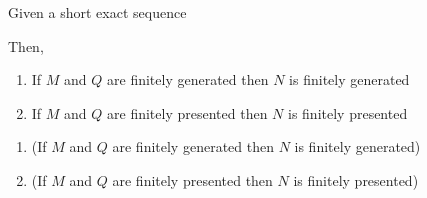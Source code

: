 \begin{proposition}
	Given a short exact sequence
	\begin{center}
	\end{center}
	
	Then,
	\begin{enumerate}
		\item If $M$ and $Q$ are finitely generated then $N$ is finitely generated
		\item If $M$ and $Q$ are finitely presented then $N$ is finitely presented
	\end{enumerate}
\end{proposition}

\begin{longproof}
	\begin{enumerate}
		\item (If $M$ and $Q$ are finitely generated then $N$ is finitely generated)
		
		
		\item (If $M$ and $Q$ are finitely presented then $N$ is finitely presented)
		
	\end{enumerate}
\end{longproof}

